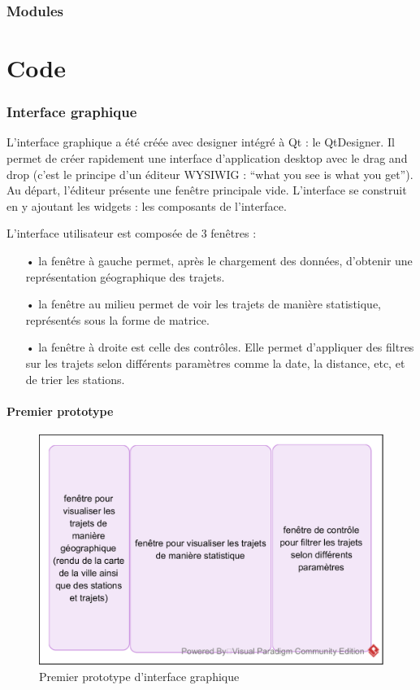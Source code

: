 \documentclass[12pt]{article}
\begin{document}
	\section{Modules}

\newpage
\part{Code}
	\section{Interface graphique}
	L’interface graphique a été créée avec designer intégré à Qt : le QtDesigner. Il permet de créer rapidement une interface d’application desktop avec le drag and drop (c’est le principe d’un éditeur WYSIWIG : “what you see is what you get”). Au départ, l’éditeur présente une fenêtre principale vide. L’interface se construit en y ajoutant les widgets : les composants de l’interface.

	L’interface utilisateur est composée de 3 fenêtres :\\
	\begin{itemize}
	\item[•] la fenêtre à gauche permet, après le chargement des données, d’obtenir une représentation géographique des trajets.
	\item[•] la fenêtre au milieu permet de voir les trajets de manière statistique, représentés sous la forme de matrice.
	\item[•] la fenêtre à droite est celle des contrôles. Elle permet d’appliquer des filtres sur les trajets selon différents paramètres comme la date, la distance, etc, et de trier les stations.
	\end{itemize}
	
		\subsection{Premier prototype}
		\begin{figure}[!h]
		\begin{center}
		\includegraphics[scale=1]{dia_proto-interface_1.png}
		\caption{Premier prototype d’interface graphique}
		\end{center}
		\end{figure}
		
\end{document}
